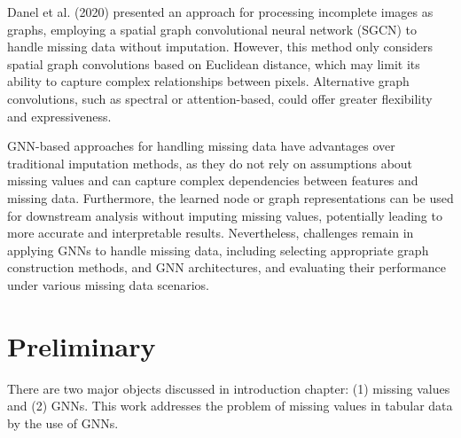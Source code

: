 Danel et al. (2020) \cite{Danel2020} presented an approach for processing incomplete images as graphs, employing a spatial graph convolutional neural network (SGCN) to handle missing data without imputation. However, this method only considers spatial graph convolutions based on Euclidean distance, which may limit its ability to capture complex relationships between pixels. Alternative graph convolutions, such as spectral or attention-based, could offer greater flexibility and expressiveness.

GNN-based approaches for handling missing data have advantages over traditional imputation methods, as they do not rely on assumptions about missing values and can capture complex dependencies between features and missing data. Furthermore, the learned node or graph representations can be used for downstream analysis without imputing missing values, potentially leading to more accurate and interpretable results. Nevertheless, challenges remain in applying GNNs to handle missing data, including selecting appropriate graph construction methods, and GNN architectures, and evaluating their performance under various missing data scenarios.


\section{Preliminary}
There are two major objects discussed in introduction chapter: (1) missing values and (2) GNNs.
This work addresses the problem of missing values in tabular data by the use of GNNs.

